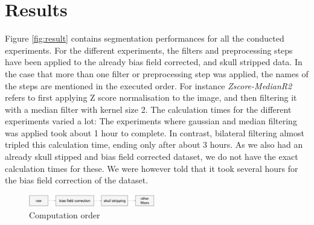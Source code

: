 \documentclass[journal]{IEEEtran}
\begin{document}
\section{Results}
Figure \ref{fig:result} contains segmentation performances for all the conducted experiments. For the different experiments, the filters and preprocessing steps have been applied to the already bias field corrected, and skull stripped data. In the case that more than one filter or preprocessing step was applied, the names of the steps are mentioned in the executed order. For instance \textit{Zscore-MedianR2} refers to first applying Z score normalisation to the image, and then filtering it with a median filter with kernel size 2. The calculation times for the different experiments varied a lot: The experiments where gaussian and median filtering was applied took about 1 hour to complete. In contrast, bilateral filtering almost tripled this calculation time, ending only after about 3 hours. As we also had an already skull stipped and bias field corrected dataset, we do not have the exact calculation times for these. We were however told that it took several hours for the bias field correction of the dataset.

\begin{figure}[!h]
\centering
\includegraphics[width=0.49\textwidth]{png/preprocessing-pipeline.png}
\caption{Computation order}
\end{figure}
\end{document}
